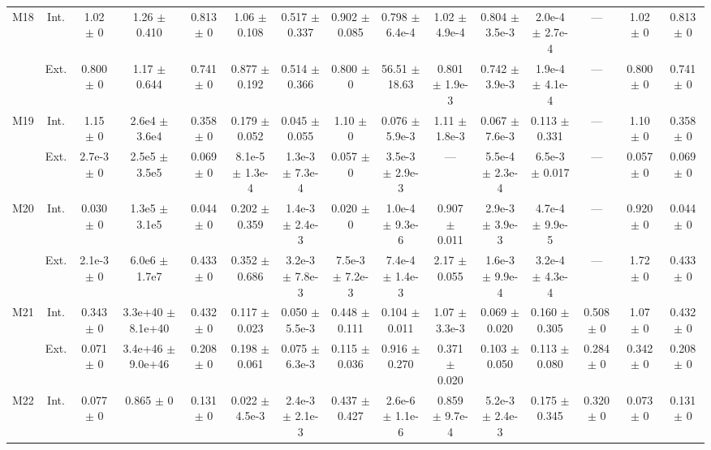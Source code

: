 \begin{table}[htbp]
{\begin{tabular}{@{}ccccccccccccccc@{}}
\cline{2-15}
\multirow{2}{*}{M18} & Int. & 1.02 $\pm$ 0 & 1.26 $\pm$ 0.410 & 0.813 $\pm$ 0 & 1.06 $\pm$ 0.108 & 0.517 $\pm$ 0.337 & 0.902 $\pm$ 0.085 & 0.798 $\pm$ 6.4e-4 & 1.02 $\pm$ 4.9e-4 & 0.804 $\pm$ 3.5e-3 & 2.0e-4 $\pm$ 2.7e-4 & --- & 1.02 $\pm$ 0 & 0.813 $\pm$ 0 \\
 & Ext. & 0.800 $\pm$ 0 & 1.17 $\pm$ 0.644 & 0.741 $\pm$ 0 & 0.877 $\pm$ 0.192 & 0.514 $\pm$ 0.366 & 0.800 $\pm$ 0 & 56.51 $\pm$ 18.63 & 0.801 $\pm$ 1.9e-3 & 0.742 $\pm$ 3.9e-3 & 1.9e-4 $\pm$ 4.1e-4 & --- & 0.800 $\pm$ 0 & 0.741 $\pm$ 0 \\
\cline{2-15}
\multirow{2}{*}{M19} & Int. & 1.15 $\pm$ 0 & 2.6e4 $\pm$ 3.6e4 & 0.358 $\pm$ 0 & 0.179 $\pm$ 0.052 & 0.045 $\pm$ 0.055 & 1.10 $\pm$ 0 & 0.076 $\pm$ 5.9e-3 & 1.11 $\pm$ 1.8e-3 & 0.067 $\pm$ 7.6e-3 & 0.113 $\pm$ 0.331 & --- & 1.10 $\pm$ 0 & 0.358 $\pm$ 0 \\
 & Ext. & 2.7e-3 $\pm$ 0 & 2.5e5 $\pm$ 3.5e5 & 0.069 $\pm$ 0 & 8.1e-5 $\pm$ 1.3e-4 & 1.3e-3 $\pm$ 7.3e-4 & 0.057 $\pm$ 0 & 3.5e-3 $\pm$ 2.9e-3 & --- & 5.5e-4 $\pm$ 2.3e-4 & 6.5e-3 $\pm$ 0.017 & --- & 0.057 $\pm$ 0 & 0.069 $\pm$ 0 \\
\cline{2-15}
\multirow{2}{*}{M20} & Int. & 0.030 $\pm$ 0 & 1.3e5 $\pm$ 3.1e5 & 0.044 $\pm$ 0 & 0.202 $\pm$ 0.359 & 1.4e-3 $\pm$ 2.4e-3 & 0.020 $\pm$ 0 & 1.0e-4 $\pm$ 9.3e-6 & 0.907 $\pm$ 0.011 & 2.9e-3 $\pm$ 3.9e-3 & 4.7e-4 $\pm$ 9.9e-5 & --- & 0.920 $\pm$ 0 & 0.044 $\pm$ 0 \\
 & Ext. & 2.1e-3 $\pm$ 0 & 6.0e6 $\pm$ 1.7e7 & 0.433 $\pm$ 0 & 0.352 $\pm$ 0.686 & 3.2e-3 $\pm$ 7.8e-3 & 7.5e-3 $\pm$ 7.2e-3 & 7.4e-4 $\pm$ 1.4e-3 & 2.17 $\pm$ 0.055 & 1.6e-3 $\pm$ 9.9e-4 & 3.2e-4 $\pm$ 4.3e-4 & --- & 1.72 $\pm$ 0 & 0.433 $\pm$ 0 \\
\cline{2-15}
\multirow{2}{*}{M21} & Int. & 0.343 $\pm$ 0 & 3.3e+40 $\pm$ 8.1e+40 & 0.432 $\pm$ 0 & 0.117 $\pm$ 0.023 & 0.050 $\pm$ 5.5e-3 & 0.448 $\pm$ 0.111 & 0.104 $\pm$ 0.011 & 1.07 $\pm$ 3.3e-3 & 0.069 $\pm$ 0.020 & 0.160 $\pm$ 0.305 & 0.508 $\pm$ 0 & 1.07 $\pm$ 0 & 0.432 $\pm$ 0 \\
 & Ext. & 0.071 $\pm$ 0 & 3.4e+46 $\pm$ 9.0e+46 & 0.208 $\pm$ 0 & 0.198 $\pm$ 0.061 & 0.075 $\pm$ 6.3e-3 & 0.115 $\pm$ 0.036 & 0.916 $\pm$ 0.270 & 0.371 $\pm$ 0.020 & 0.103 $\pm$ 0.050 & 0.113 $\pm$ 0.080 & 0.284 $\pm$ 0 & 0.342 $\pm$ 0 & 0.208 $\pm$ 0 \\
\cline{2-15}
\multirow{2}{*}{M22} & Int. & 0.077 $\pm$ 0 & 0.865 $\pm$ 0 & 0.131 $\pm$ 0 & 0.022 $\pm$ 4.5e-3 & 2.4e-3 $\pm$ 2.1e-3 & 0.437 $\pm$ 0.427 & 2.6e-6 $\pm$ 1.1e-6 & 0.859 $\pm$ 9.7e-4 & 5.2e-3 $\pm$ 2.4e-3 & 0.175 $\pm$ 0.345 & 0.320 $\pm$ 0 & 0.073 $\pm$ 0 & 0.131 $\pm$ 0 \\

\end{tabular}}
\end{table}
